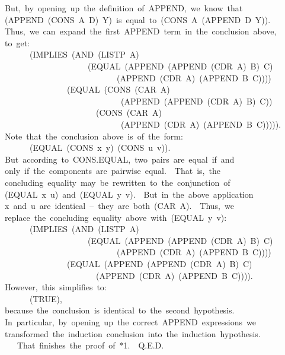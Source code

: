 \documentclass[11pt]{book}
\newenvironment{pubasis}{\begin{flushleft}\ttfamily\small}{\normalsize\rmfamily\end{flushleft}}
\begin{document}
\begin{pubasis}
~~But,~by~opening~up~the~definition~of~APPEND,~we~know~that\\
~~(APPEND~(CONS~A~D)~Y)~is~equal~to~(CONS~A~(APPEND~D~Y)).\\
~~Thus,~we~can~expand~the~first~APPEND~term~in~the~conclusion~above,\\
~~to~get:\\

~~~~~~~~(IMPLIES~(AND~(LISTP~A)\\
~~~~~~~~~~~~~~~~~~~~~~(EQUAL~(APPEND~(APPEND~(CDR~A)~B)~C)\\
~~~~~~~~~~~~~~~~~~~~~~~~~~~~~(APPEND~(CDR~A)~(APPEND~B~C))))\\
~~~~~~~~~~~~~~~~~(EQUAL~(CONS~(CAR~A)\\
~~~~~~~~~~~~~~~~~~~~~~~~~~~~~~(APPEND~(APPEND~(CDR~A)~B)~C))\\
~~~~~~~~~~~~~~~~~~~~~~~~(CONS~(CAR~A)\\
~~~~~~~~~~~~~~~~~~~~~~~~~~~~~~(APPEND~(CDR~A)~(APPEND~B~C))))).\\

~~Note~that~the~conclusion~above~is~of~the~form:\\

~~~~~~~~(EQUAL~(CONS~x~y)~(CONS~u~v)).\\

~~But~according~to~CONS.EQUAL,~two~pairs~are~equal~if~and\\
~~only~if~the~components~are~pairwise~equal.~~That~is,~the\\
~~concluding~equality~may~be~rewritten~to~the~conjunction~of\\
~~(EQUAL~x~u)~and~(EQUAL~y~v).~~But~in~the~above~application\\
~~x~and~u~are~identical~--~they~are~both~(CAR~A).~~Thus,~we\\
~~replace~the~concluding~equality~above~with~(EQUAL~y~v):\\

~~~~~~~~(IMPLIES~(AND~(LISTP~A)\\
~~~~~~~~~~~~~~~~~~~~~~(EQUAL~(APPEND~(APPEND~(CDR~A)~B)~C)\\
~~~~~~~~~~~~~~~~~~~~~~~~~~~~~(APPEND~(CDR~A)~(APPEND~B~C))))\\
~~~~~~~~~~~~~~~~~(EQUAL~(APPEND~(APPEND~(CDR~A)~B)~C)\\
~~~~~~~~~~~~~~~~~~~~~~~~(APPEND~(CDR~A)~(APPEND~B~C)))).\\

~~However,~this~simplifies~to:\\

~~~~~~~~(TRUE),\\

~~because~the~conclusion~is~identical~to~the~second~hypothesis.\\
~~In~particular,~by~opening~up~the~correct~APPEND~expressions~we\\
~~transformed~the~induction~conclusion~into~the~induction~hypothesis.\\

~~~~~That~finishes~the~proof~of~*1.~~Q.E.D.\\
\end{pubasis}
\end{document}

